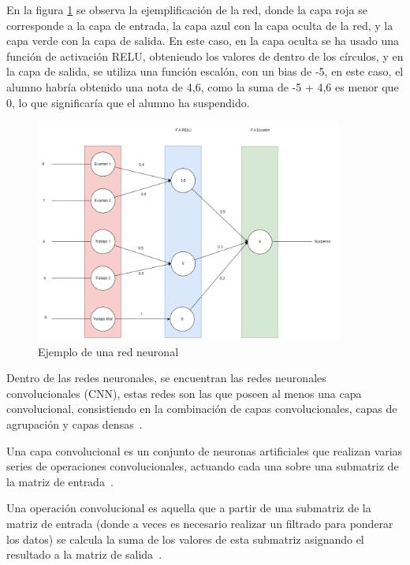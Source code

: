     En la figura  \ref{fig:ejemploRedNeuronal} se observa la ejemplificación de la red, donde la capa roja se corresponde a la capa de entrada, la capa azul con la capa oculta de la red, y la capa verde con la capa de salida. En este caso, en la capa oculta se ha usado una función de activación RELU, obteniendo los valores de dentro de los círculos, y en la capa de salida, se utiliza una función escalón, con un bias de -5, en este caso, el alumno habría obtenido una nota de 4,6, como la suma de -5 + 4,6 es menor que 0, lo que significaría que el alumno ha suspendido.
    
    \begin{figure}[!ht]
         \centering
         \includegraphics[width=0.9\textwidth]{img/Ejemplo Red Neuronal.png}
         \caption{Ejemplo de una red neuronal}
         \label{fig:ejemploRedNeuronal}
    \end{figure}
    
     Dentro de las redes neuronales, se encuentran las redes neuronales convolucionales (CNN), estas redes son las que poseen al menos una capa convolucional, consistiendo en la combinación de capas convolucionales, capas de agrupación y capas densas~\cite{definicion_CNN}.

     Una capa convolucional es un conjunto de neuronas artificiales que realizan varias series de operaciones convolucionales, actuando cada una sobre una submatriz de la matriz de entrada~\cite{definicionConvolucional_layer}.
     
     Una operación convolucional es aquella que a partir de una submatriz de la matriz de entrada (donde a veces es necesario realizar un filtrado para ponderar los datos) se calcula la suma de los valores de esta submatriz asignando el resultado a la matriz de salida~\cite{definicionConvolutional_Operation}.
     
